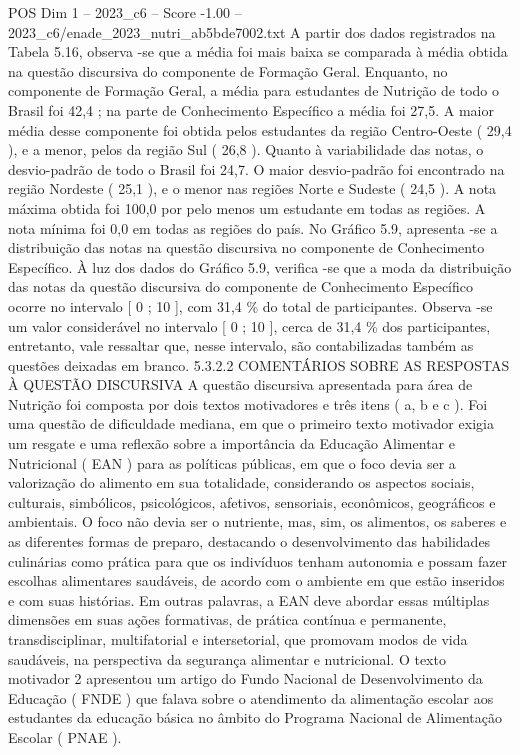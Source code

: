 \begin{textsample}{POS Dim 1 – 2023\_c6 – Score -1.00 – 2023\_c6/enade\_2023\_nutri\_ab5bde7002.txt}
A partir dos dados registrados na Tabela 5.16, observa -se que a média foi mais baixa se comparada à média obtida na questão discursiva do componente de Formação Geral.
Enquanto, no componente de Formação Geral, a média para estudantes de Nutrição de todo o Brasil foi 42,4 ; na parte de Conhecimento Específico a média foi 27,5.
A maior média desse componente foi obtida pelos estudantes da região Centro-Oeste ( 29,4 ), e a menor, pelos da região Sul ( 26,8 ).
Quanto à variabilidade das notas, o desvio-padrão de todo o Brasil foi 24,7.
O maior desvio-padrão foi encontrado na região Nordeste ( 25,1 ), e o menor nas regiões Norte e Sudeste ( 24,5 ).
A nota máxima obtida foi 100,0 por pelo menos um estudante em todas as regiões.
A nota mínima foi 0,0 em todas as regiões do país.
No Gráfico 5.9, apresenta -se a distribuição das notas na questão discursiva no componente de Conhecimento Específico.
À luz dos dados do Gráfico 5.9, verifica -se que a moda da distribuição das notas da questão discursiva do componente de Conhecimento Específico ocorre no intervalo [ 0 ; 10 ], com 31,4 \% do total de participantes.
Observa -se um valor considerável no intervalo [ 0 ; 10 ], cerca de 31,4 \% dos participantes, entretanto, vale ressaltar que, nesse intervalo, são contabilizadas também as questões deixadas em branco. 5.3.2.2 COMENTÁRIOS SOBRE AS RESPOSTAS À QUESTÃO DISCURSIVA A questão discursiva apresentada para área de Nutrição foi composta por dois textos motivadores e três itens ( a, b e c ).
Foi uma questão de dificuldade mediana, em que o primeiro texto motivador exigia um resgate e uma reflexão sobre a importância da Educação Alimentar e Nutricional ( EAN ) para as políticas públicas, em que o foco devia ser a valorização do alimento em sua totalidade, considerando os aspectos sociais, culturais, simbólicos, psicológicos, afetivos, sensoriais, econômicos, geográficos e ambientais.
O foco não devia ser o nutriente, mas, sim, os alimentos, os saberes e as diferentes formas de preparo, destacando o desenvolvimento das habilidades culinárias como prática para que os indivíduos tenham autonomia e possam fazer escolhas alimentares saudáveis, de acordo com o ambiente em que estão inseridos e com suas histórias.
Em outras palavras, a EAN deve abordar essas múltiplas dimensões em suas ações formativas, de prática contínua e permanente, transdisciplinar, multifatorial e intersetorial, que promovam modos de vida saudáveis, na perspectiva da segurança alimentar e nutricional.
O texto motivador 2 apresentou um artigo do Fundo Nacional de Desenvolvimento da Educação ( FNDE ) que falava sobre o atendimento da alimentação escolar aos estudantes da educação básica no âmbito do Programa Nacional de Alimentação Escolar ( PNAE ).

\end{textsample}

